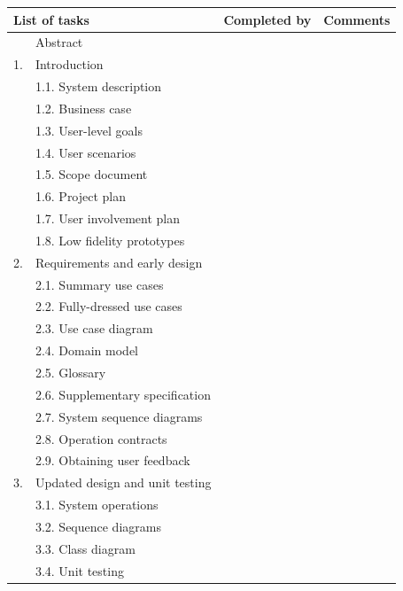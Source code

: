 \documentclass[12pt,a4paper]{article}
\begin{document}
\begin{longtable}{| p{0.2cm} p{6.25cm} | p{3cm}| p{5cm} |}
  \hline
  \multicolumn{2}{|l|}{\textbf{List of tasks}} & \textbf{Completed by} & \textbf{Comments} \\ \hline
   & Abstract &  &  \\ \hline
  1. & Introduction &  &  \\ \hline
   & 1.1. System description &  &  \\ \hline
   & 1.2. Business case &  &  \\ \hline
   & 1.3. User-level goals &  &  \\ \hline
   & 1.4. User scenarios &  &  \\ \hline
   & 1.5. Scope document &  &  \\ \hline
   & 1.6. Project plan &  &  \\ \hline
   & 1.7. User involvement plan &  &  \\ \hline
   & 1.8. Low fidelity prototypes &  &  \\ \hline
  2. & Requirements and early design &  &  \\ \hline
   & 2.1. Summary use cases &  &  \\ \hline
   & 2.2. Fully-dressed use cases &  &  \\ \hline
   & 2.3. Use case diagram &  &  \\ \hline
   & 2.4. Domain model &  &  \\ \hline
   & 2.5. Glossary &  &  \\ \hline
   & 2.6. Supplementary specification &  &  \\ \hline
   & 2.7. System sequence diagrams &  &  \\ \hline
   & 2.8. Operation contracts &  &  \\ \hline
   & 2.9. Obtaining user feedback &  &  \\ \hline
  3. & Updated design and unit testing &  &  \\ \hline
   & 3.1. System operations &  &  \\ \hline
   & 3.2. Sequence diagrams &  &  \\ \hline
   & 3.3. Class diagram &  &  \\ \hline
   & 3.4. Unit testing &  &  \\ \hline

\end{longtable}
\end{document}
